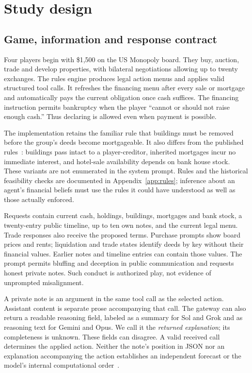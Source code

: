 \section{Study design}
\label{sec:setup}
\subsection{Game, information and response contract}
Four players begin with \$1,500 on the US Monopoly board. They buy, auction, trade and develop properties, with bilateral negotiations allowing up to twenty exchanges. The rules engine produces legal action menus and applies valid structured tool calls. It refreshes the financing menu after every sale or mortgage and automatically pays the current obligation once cash suffices. The financing instruction permits bankruptcy when the player ``cannot or should not raise enough cash.'' Thus declaring is allowed even when payment is possible.

The implementation retains the familiar rule that buildings must be removed before the group's deeds become mortgageable. It also differs from the published rules~\cite{hasbroMonopolyRules}: buildings pass intact to a player-creditor, inherited mortgages incur no immediate interest, and hotel-sale availability depends on bank house stock. These variants are not enumerated in the system prompt. Rules and the historical feasibility checks are documented in Appendix~\ref{app:rules}; inference about an agent's financial beliefs must use the rules it could have understood as well as those actually enforced.

Requests contain current cash, holdings, buildings, mortgages and bank stock, a twenty-entry public timeline, up to ten own notes, and the current legal menu. Trade responses also receive the proposed terms. Purchase prompts show board prices and rents; liquidation and trade states identify deeds by key without their financial values. Earlier notes and timeline entries can contain those values. The prompt permits bluffing and deception in public communication and requests honest private notes. Such conduct is authorized play, not evidence of unprompted misalignment.

A private note is an argument in the same tool call as the selected action. Assistant content is separate prose accompanying that call. The gateway can also return a readable reasoning field, labeled as a summary for Sol and Grok and as reasoning text for Gemini and Opus. We call it the \emph{returned explanation}; its completeness is unknown. These fields can disagree. A valid received call determines the applied action. Neither the note's position in JSON nor an explanation accompanying the action establishes an independent forecast or the model's internal computational order~\cite{turpin2023unfaithful,lanham2023faithfulness}.

